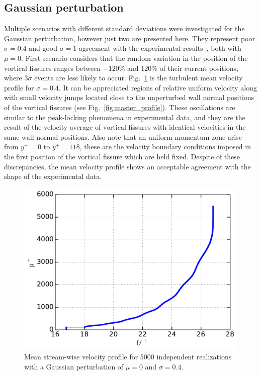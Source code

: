 \documentclass[aps,reprint,amsmath,amssymb,pra]{revtex4-1}%
\begin{document}
\subsection{Gaussian perturbation}
Multiple scenarios with different standard deviations were investigated for the Gaussian perturbation, however just two are presented here. They represent poor $\sigma=0.4$ and good $\sigma=1$ agreement with the experimental results~\cite{Vincenti2013,FLM}, both with $\mu=0$. First scenario considers that the random variation in the position of the vortical fissures ranges between $-120\%$ and $120\%$ of their current positions, where $3\sigma$ events are less likely to occur. Fig.~\ref{fig:mean_profile} is the turbulent mean velocity profile for $\sigma=0.4$. It can be appreciated regions of relative uniform velocity along with small velocity jumps located close to the unperturbed wall normal positions of the vortical fissures (see Fig.~\ref{fig:master_profile}). These oscillations are similar to the peak-locking phenomena in experimental data, and they are the result of  the velocity average of vortical fissures with identical velocities in the same wall normal positions. Also note that an uniform momentum zone arise from $y^+=0$ to $y^+=118$, these are the velocity boundary conditions imposed in the first position of the vortical fissure which are held fixed. Despite of these discrepancies, the mean velocity profile shows an acceptable agreement with the shape of the experimental data.\\
\begin{figure}[b]
\includegraphics[scale=0.46]{figures/Master_averaged_step_profile_5000_assembles}
\caption{\label{fig:mean_profile} Mean stream-wise velocity profile for 5000 independent realizations with a Gaussian perturbation of $\mu=0$ and $\sigma=0.4$.}
\end{figure}
\end{document}
